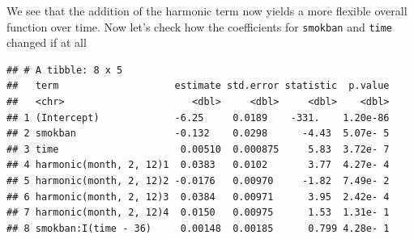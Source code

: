 \documentclass[
]{book}
\newenvironment{Shaded}{\begin{snugshade}}{\end{snugshade}}
\newcommand{\DataTypeTok}[1]{\textcolor[rgb]{0.13,0.29,0.53}{#1}}
\newcommand{\DecValTok}[1]{\textcolor[rgb]{0.00,0.00,0.81}{#1}}
\newcommand{\FloatTok}[1]{\textcolor[rgb]{0.00,0.00,0.81}{#1}}
\newcommand{\KeywordTok}[1]{\textcolor[rgb]{0.13,0.29,0.53}{\textbf{#1}}}
\newcommand{\NormalTok}[1]{#1}
\newcommand{\OperatorTok}[1]{\textcolor[rgb]{0.81,0.36,0.00}{\textbf{#1}}}
\newcommand{\StringTok}[1]{\textcolor[rgb]{0.31,0.60,0.02}{#1}}
\begin{document}
We see that the addition of the harmonic term now yields a more flexible overall function over time. Now let's check how the coefficients for \texttt{smokban} and \texttt{time} changed if at all

\begin{Shaded}
\end{Shaded}

\begin{verbatim}
## # A tibble: 8 x 5
##   term                    estimate std.error statistic  p.value
##   <chr>                      <dbl>     <dbl>     <dbl>    <dbl>
## 1 (Intercept)             -6.25     0.0189    -331.    1.20e-86
## 2 smokban                 -0.132    0.0298      -4.43  5.07e- 5
## 3 time                     0.00510  0.000875     5.83  3.72e- 7
## 4 harmonic(month, 2, 12)1  0.0383   0.0102       3.77  4.27e- 4
## 5 harmonic(month, 2, 12)2 -0.0176   0.00970     -1.82  7.49e- 2
## 6 harmonic(month, 2, 12)3  0.0384   0.00971      3.95  2.42e- 4
## 7 harmonic(month, 2, 12)4  0.0150   0.00975      1.53  1.31e- 1
## 8 smokban:I(time - 36)     0.00148  0.00185      0.799 4.28e- 1
\end{verbatim}

\begin{Shaded}
\end{Shaded}
\end{document}
